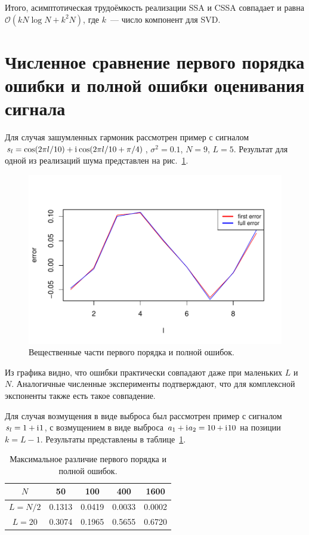 \documentclass[12pt,a4paper]{article}
\begin{document}
Итого, асимптотическая трудоёмкость реализации SSA и CSSA совпадает и равна $\mathcal{O}(k N \log N + k^2 N)$, где $k$~--- число компонент для SVD.

\section{Численное сравнение первого порядка ошибки и полной ошибки оценивания сигнала}
\label{sec:results}
Для случая зашумленных гармоник рассмотрен пример с сигналом $s_l = \cos(2 \pi l / 10) + \mathrm{i}\mkern1mu\cos(2 \pi l / 10 + \pi/4)$, $\sigma^2 = 0.1$, $N = 9$, $L = 5$. Результат для одной из реализаций шума представлен на рис.~\ref{fig:harm_noise}.

\begin{figure}[H]
	\begin{center}
		\includegraphics[width=0.6\linewidth]{img/first_vs_full_re.pdf}
		\caption{Вещественные части первого порядка и полной ошибок.}
		\label{fig:harm_noise}
	\end{center}
\end{figure}

Из графика видно, что ошибки практически совпадают даже при маленьких $L$ и $N$. Аналогичные численные эксперименты подтверждают, что для комплексной экспоненты также есть такое совпадение.

Для случая возмущения в виде выброса был рассмотрен пример с сигналом $s_l = 1 + \mathrm{i}\mkern1mu 1$, с возмущением в виде выброса $a_1 + \mathrm{i}\mkern1mu a_2 = 10 + \mathrm{i}\mkern1mu 10$ на позиции $k = L - 1$. Результаты представлены в таблице~\ref{tab:const_outl}.

\begin{table}[H]
	\begin{center}
		\caption{Максимальное различие первого порядка и полной ошибок.}
		\label{tab:const_outl}
		\begin{tabular}{|c|c|c|c|c|}
			\hline
			$N$	& 50 & 100 & 400 & 1600 \\
			\hline
			$L = N / 2$ & 0.1313  & 0.0419  & 0.0033 & 0.0002 \\
			\hline
			$L = 20$ & 0.3074  & 0.1965  & 0.5655 & 0.6720 \\
			\hline
		\end{tabular}
	\end{center}
\end{table}
\end{document}
